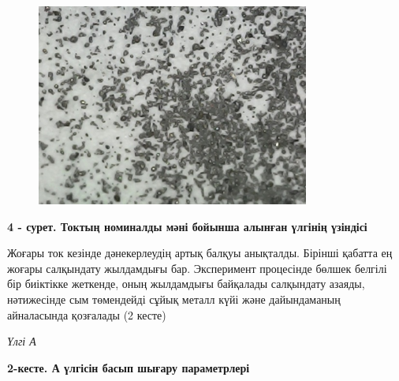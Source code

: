 \begin{figure}[H]
	\centering
	\includegraphics[width=0.8\textwidth]{media/ict2/image190}
	\caption*{}
\end{figure}


{\bfseries 4 - сурет. Токтың номиналды мәні бойынша алынған үлгінің
үзіндісі}

Жоғары ток кезінде дәнекерлеудің артық балқуы анықталды. Бірінші қабатта
ең жоғары салқындату жылдамдығы бар. Эксперимент процесінде бөлшек
белгілі бір биіктікке жеткенде, оның жылдамдығы байқалады салқындату
азаяды, нәтижесінде сым төмендейді сұйық металл күйі және дайындаманың
айналасында қозғалады (2 кесте)

\emph{Үлгі А}

{\bfseries 2-кесте. А үлгісін басып шығару параметрлері}




